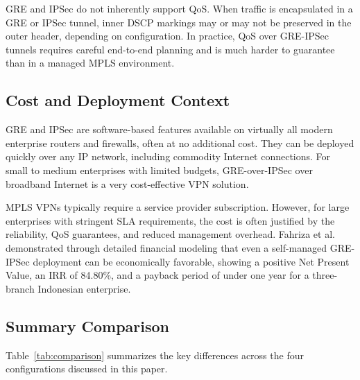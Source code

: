 \documentclass[conference]{IEEEtran}
\begin{document}
GRE and IPSec do not inherently support QoS. When traffic is
encapsulated in a GRE or IPSec tunnel, inner DSCP markings may or
may not be preserved in the outer header, depending on
configuration. In practice, QoS over GRE-IPSec tunnels requires
careful end-to-end planning and is much harder to guarantee than
in a managed MPLS environment.

\subsection{Cost and Deployment Context}

GRE and IPSec are software-based features available on virtually
all modern enterprise routers and firewalls, often at no
additional cost. They can be deployed quickly over any IP network,
including commodity Internet connections. For small to medium
enterprises with limited budgets, GRE-over-IPSec over broadband
Internet is a very cost-effective VPN solution.

MPLS VPNs typically require a service provider subscription.
However, for large enterprises with stringent SLA requirements,
the cost is often justified by the reliability, QoS guarantees,
and reduced management overhead. Fahriza et al.~\cite{fahriza2026}
demonstrated through detailed financial modeling that even a
self-managed GRE-IPSec deployment can be economically favorable,
showing a positive Net Present Value, an IRR of 84.80\%, and
a payback period of under one year for a three-branch Indonesian
enterprise.

\subsection{Summary Comparison}

Table~\ref{tab:comparison} summarizes the key differences across
the four configurations discussed in this paper.
\end{document}
